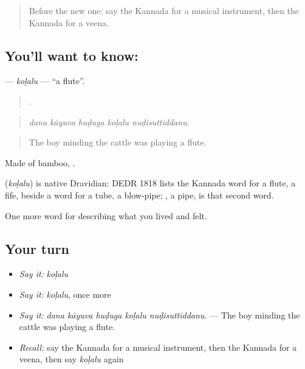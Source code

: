 \label{lesson:KA-C535-kolalu}



\begin{quote}
Before the new one: say the Kannada for a musical instrument, then the Kannada for a veena.
\end{quote}

\subsection*{You'll want to know: }
\textbf{} — \emph{koḷalu} — \textquotedblleft{}a flute\textquotedblright{}.

\begin{quote}
    .
\end{quote}

\begin{quote}
\emph{dana kāyuva huḍuga koḷalu nuḍisuttiddanu.}
\end{quote}

\begin{quote}
The boy minding the cattle was playing a flute.
\end{quote}

Made of bamboo, .

\begin{cousinweb}
\textbf{} (\emph{koḷalu}) is native Dravidian: DEDR 1818 lists the Kannada word for a flute, a fife, beside a word for a tube, a blow-pipe; , a pipe, is that second word.
\end{cousinweb}

\begin{grammarlens}[title={What you've built}]
One more word for describing what you lived and felt.
\end{grammarlens}

\subsection*{Your turn}
\begin{itemize}
\raggedright
  \item \emph{Say it:} \emph{koḷalu}
  \item \emph{Say it:} \emph{koḷalu}, once more
  \item \emph{Say it:} \emph{dana kāyuva huḍuga koḷalu nuḍisuttiddanu.} — The boy minding the cattle was playing a flute.
  \item \emph{Recall:} say the Kannada for a musical instrument, then the Kannada for a veena, then say \emph{koḷalu} again
\end{itemize}

